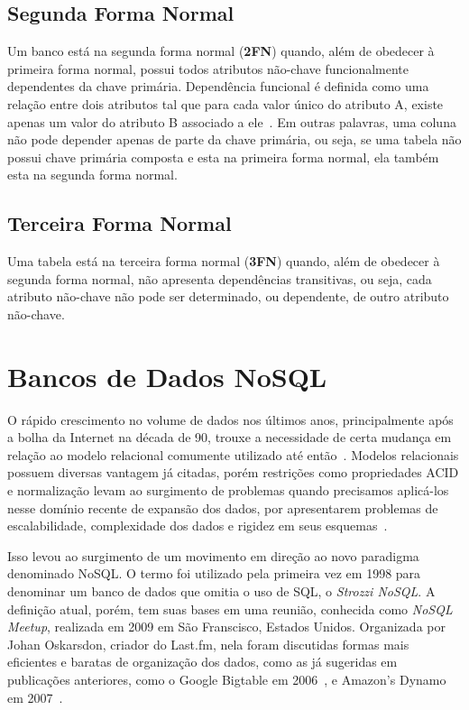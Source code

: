 \subsection*{Segunda Forma Normal}
Um banco está na segunda forma normal (\textbf{2FN}) quando, além de obedecer à primeira forma normal, possui todos atributos não-chave funcionalmente dependentes da chave primária. Dependência funcional é definida como uma relação entre dois atributos tal que para cada valor único do atributo A, existe apenas um valor do atributo B associado a ele~\cite{jan}. Em outras palavras, uma coluna não pode depender apenas de parte da chave primária, ou seja, se uma tabela não possui chave primária composta e esta na primeira forma normal, ela também esta na segunda forma normal.

\subsection*{Terceira Forma Normal}
Uma tabela está na terceira forma normal (\textbf{3FN}) quando, além de obedecer à segunda forma normal, não apresenta dependências transitivas, ou seja, cada atributo não-chave não pode ser determinado, ou dependente, de outro atributo não-chave. 

\section{Bancos de Dados NoSQL}
O rápido crescimento no volume de dados nos últimos anos, principalmente após a bolha da Internet na década de 90, trouxe a necessidade de certa mudança em relação ao modelo relacional comumente utilizado até então~\cite{pramod}. Modelos relacionais possuem diversas vantagem já citadas, porém restrições como propriedades ACID e normalização levam ao surgimento de problemas quando precisamos aplicá-los nesse domínio recente de expansão dos dados, por apresentarem problemas de escalabilidade, complexidade dos dados e rigidez em seus esquemas~\cite{leavitt2010nosql}. 

Isso levou ao surgimento de um movimento em direção ao novo paradigma denominado NoSQL. O termo foi utilizado pela primeira vez em 1998 para denominar um banco de dados que omitia o uso de SQL, o \emph{Strozzi NoSQL}. A definição atual, porém, tem suas bases em uma reunião, conhecida como \emph{NoSQL Meetup}, realizada em 2009 em São Franscisco, Estados Unidos. Organizada por Johan Oskarsdon, criador do Last.fm, nela foram discutidas formas mais eficientes e baratas de organização dos dados, como as já sugeridas em publicações anteriores, como o Google Bigtable em 2006~\cite{bigtable}, e Amazon's Dynamo em 2007~\cite{dynamo, chrisnosql}.
